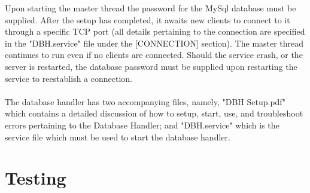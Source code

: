 \documentclass[letterpaper]{report}
\begin{document}
	Upon starting the master thread the password for the MySql database must be supplied. After the setup has completed, it awaits new clients to connect to it through a specific TCP port (all details pertaining to the connection are specified in the "DBH.service" file under the [CONNECTION] section). The master thread continues to run even if no clients are connected. Should the service crash, or the server is restarted, the database password must be supplied upon restarting the service to reestablish a connection. \\ \\ The database handler has two accompanying files, namely, "DBH Setup.pdf" which contains a detailed discussion of how to setup, start, use, and troubleshoot errors pertaining to the Database Handler; and "DBH.service" which is the service file which must be used to start the database handler. 
	\chapter{Testing}
	
\end{document}

